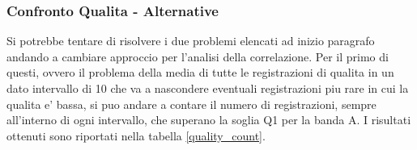 \begin{table}[H]
    \begin{minipage}{.5\textwidth}
      \centering
    \end{minipage}
    \begin{minipage}{.5\textwidth}
      \centering
    \end{minipage}
  \end{table}


\subsubsection{Confronto Qualita - Alternative}
Si potrebbe tentare di risolvere i due problemi elencati ad inizio paragrafo andando a cambiare approccio per l'analisi della correlazione.
Per il primo di questi, ovvero il problema della media di tutte le registrazioni di qualita in un dato intervallo di 10 che va a nascondere eventuali registrazioni piu rare in cui la qualita e' bassa, si puo andare a contare il numero di registrazioni, sempre all'interno di ogni intervallo, che superano la soglia Q1 per la banda A.
I risultati ottenuti sono riportati nella tabella \ref{quality_count}.

